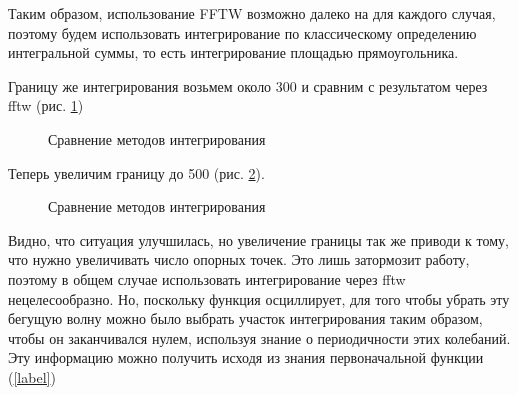 \documentclass[14pt]{extarticle}
\begin{document}
Таким образом, использование FFTW возможно далеко на для каждого случая, поэтому будем использовать интегрирование по классическому определению интегральной суммы, то есть интегрирование площадью прямоугольника.

Границу же интегрирования возьмем около 300 и сравним с результатом через fftw (рис. \ref{ris:fftw_compare_no_fftw})

\begin{figure}[h]
	\caption{Сравнение методов интегрирования}
	\label{ris:fftw_compare_no_fftw}
\end{figure}

Теперь увеличим границу до 500 (рис. \ref{ris:fftw_compare_no_fftw2}).

\begin{figure}[h]
	\caption{Сравнение методов интегрирования}
	\label{ris:fftw_compare_no_fftw2}
\end{figure}

Видно, что ситуация улучшилась, но увеличение границы так же приводи к тому, что нужно увеличивать число опорных точек. Это лишь затормозит работу, поэтому в общем случае использовать интегрирование через fftw нецелесообразно.
Но, поскольку функция осциллирует, для того чтобы убрать эту бегущую волну можно было выбрать участок интегрирования таким образом, чтобы он заканчивался нулем, используя знание о периодичности этих колебаний. 
Эту информацию можно получить исходя из знания первоначальной функции (\ref{label}) 
\end{document}
